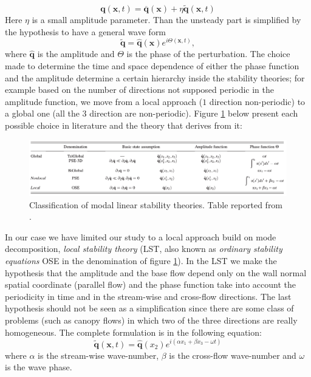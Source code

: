 $$ \mathbf{q} (\mathbf{x},t)= \overline{\mathbf{q}} (\mathbf{x}) + \eta \widetilde{\mathbf{q}} (\mathbf{x},t) $$
Here $\eta$ is a small amplitude parameter. Than the unsteady part is simplified by the hypothesis to have a general wave form
$$  \widetilde{\mathbf{q}} =  \widehat{\mathbf{q}}(\mathbf{x}) e^{i\Theta(\mathbf{x},t)}, $$
where $\widehat{\mathbf{q}}$ is the amplitude and $\Theta$ is the phase of the perturbation.
The choice made to determine the time and space dependence of either the phase function and the amplitude determine a certain hierarchy inside the stability theories; for example based on the number of directions not supposed periodic in the amplitude function, we move from a local approach ($1$ direction non-periodic) to a global one (all the $3$ direction are non-periodic).
Figure \ref{fig:table} below present each possible choice in literature and the theory that derives from it:

\begin{figure}[h]
	\centering
	\includegraphics[width=1\linewidth]{chapter_1/table}
	\caption{Classification of modal linear stability theories. Table reported from \citet{juniper2014modal}.}
	\label{fig:table}
\end{figure}
 
In our case we have limited our study to a local approach build on mode decomposition, \textit{local stability theory} (LST, also known as \textit{ordinary stability equations} OSE in the denomination of figure \ref{fig:table}).
In the LST we make the hypothesis that the amplitude and the base flow depend only on the wall normal spatial coordinate (parallel flow) and the phase function take into account the periodicity in time and in the stream-wise and cross-flow directions.
The last hypothesis should not be seen as a simplification since there are some class of problems (such as canopy flows) in which two of the three directions are really homogeneous.
The complete formulation is in the following equation:
 $$  \widetilde{\mathbf{q}}(\mathbf{x},t) =  \widehat{\mathbf{q}}(x_2) e^{i(\alpha x_1 + \beta x_3 - \omega t)}  $$ 
where $\alpha$ is the stream-wise wave-number, $\beta$ is the cross-flow wave-number and $\omega$ is the wave phase.

